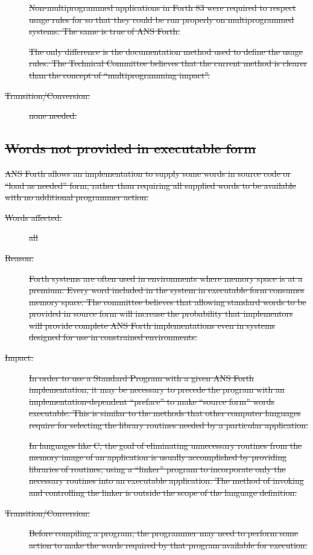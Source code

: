 \begin{description}
\sout{%
	Non-multiprogrammed applications in Forth 83 were required to
	respect usage rules for  so that they could be
	run properly on multiprogrammed systems. The same is true of
	ANS Forth.}

\sout{%
	The only difference is the documentation method used to define
	the  usage rules. The Technical Committee
	believes that the current method is clearer than the concept of
	``multi\-pro\-gram\-ming impact''.}

\item[\sout{Transition/Conversion:}]
	\sout{none needed.}
\end{description}


\subsection[Words not provided in executable form]{\sout{Words not provided in executable form}} %

\sout{%
ANS Forth allows an implementation to supply some words in source
code or ``load as needed'' form, rather than requiring all supplied
words to be available with no additional programmer action.}

\begin{description}
\item[\sout{Words affected:}]
\sout{all}

\item[\sout{Reason:}]
\sout{
	Forth systems are often used in environments where memory space
	is at a premium. Every word included in the system in executable
	form consumes memory space. The committee believes that allowing
	standard words to be provided in source form will increase the
	probability that implementors will provide complete ANS Forth
	implementations even in systems designed for use in constrained
	environments.}

\item[\sout{Impact:}]
\sout{%
	In order to use a Standard Program with a given ANS Forth
	implementation, it may be necessary to precede the program with
	an implementation-dependent ``preface'' to make ``source form''
	words executable. This is similar to the methods that other
	computer languages require for selecting the library routines
	needed by a particular application.}

\sout{%
	In languages like C, the goal of eliminating unnecessary routines
	from the memory image of an application is usually accomplished
	by providing libraries of routines, using a ``linker'' program
	to incorporate only the necessary routines into an executable
	application. The method of invoking and controlling the linker
	is outside the scope of the language definition.}

\item[\sout{Transition/Conversion:}]
\sout{%
	Before compiling a program, the programmer may need to perform
	some action to make the words required by that program available
	for execution.}
\end{description}

